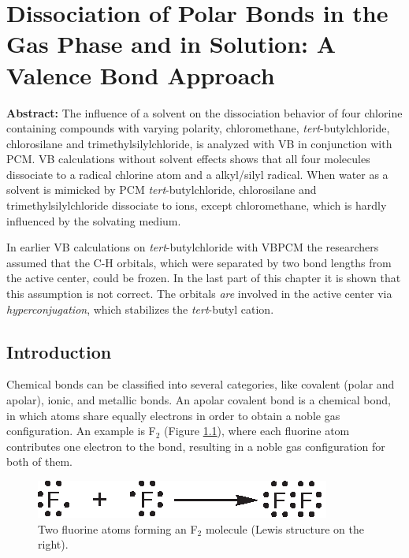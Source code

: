 \chapter{Dissociation of Polar Bonds in the Gas Phase and in Solution: A Valence Bond Approach}
\label{chap_dissociation}

\textbf{Abstract:} The influence of a solvent on the dissociation behavior of four chlorine containing compounds with varying polarity, chloromethane, \textit{tert}-butylchloride, chlorosilane and trimethylsilylchloride, is analyzed with VB in conjunction with PCM. VB calculations without solvent effects shows that all four molecules dissociate to a radical chlorine atom and a alkyl/silyl radical. When water as a solvent is mimicked by PCM \textit{tert}-butylchloride, chlorosilane and trimethylsilylchloride dissociate to ions, except chloromethane, which is hardly influenced by the solvating medium.

In earlier VB calculations on  \textit{tert}-butylchloride with VBPCM the researchers assumed that the C-H orbitals, which were separated by two bond lengths from the active center, could be frozen. In the last part of this chapter it is shown that this assumption is not correct. The orbitals \textit{are} involved in the active center via \textit{hyperconjugation}, which stabilizes the \textit{tert}-butyl cation. 

\clearpage

\section{Introduction}

Chemical bonds can be classified into several categories, like covalent (polar and apolar), ionic, and metallic bonds. An apolar covalent bond is a chemical bond, in which atoms share equally electrons in order to obtain a noble gas configuration. An example is F$_2$ (Figure \ref{ch3.fig.f_twee}), where each fluorine atom contributes one electron to the bond, resulting in a noble gas configuration for both of them.
\begin{figure}[ht]
\center
\includegraphics{dissociation/figures/f_twee.eps}
\caption{Two fluorine atoms forming an F$_2$ molecule (Lewis structure on the right).}
\label{ch3.fig.f_twee} 
\end{figure}

